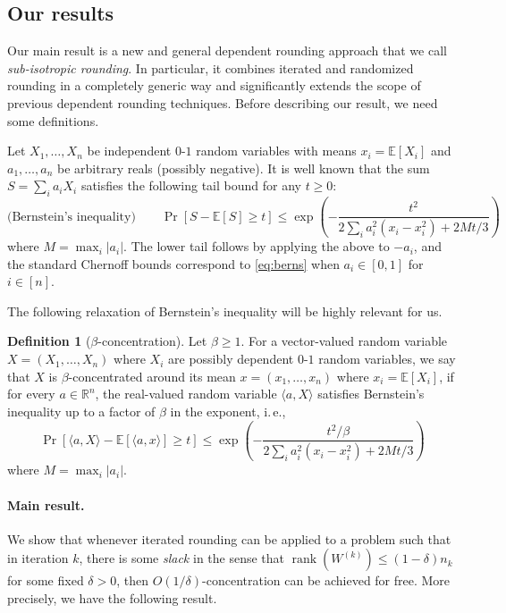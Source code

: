 \documentclass[11pt]{article}
\newcommand{\rank}{\operatorname{rank}}
\newcommand{\ip}[1]{\langle #1 \rangle}
\newcommand{\E}{\mathbb{E}}
\theoremstyle{definition}
\newtheorem{definition}[theorem]{Definition}
\newcommand{\R}{{\mathbb R}}
\newcommand{\ie}{i.\,e.}
\begin{document}
\subsection{Our results}
%
%
%

Our main result is a new and general dependent rounding approach that we call \emph{sub-isotropic rounding}. In particular, it combines iterated and randomized rounding in a completely generic way and significantly extends
the scope of previous dependent rounding techniques.
Before describing our result, we need some definitions.

Let $X_1,\ldots,X_n$ be  independent $0$-$1$ random variables with means $x_i = \E[X_i]$ and $a_1,\ldots,a_n$ be arbitrary reals (possibly negative). It is well known \cite{BLM13} that the sum
$S =\sum_i a_i X_i$ satisfies the following tail bound for any $t\geq 0$:
\begin{equation}
\label{eq:berns}
\text{(Bernstein's inequality)}  \quad \quad \Pr[ S - \E[S] \geq t] \leq \exp\left(-\frac{t^2}{2\sum_i a_i^2(x_i-x_i^2) + 2Mt/3}\right)
 \end{equation}
where $M = \max_{i} |a_i|$. The lower tail follows by applying the above to $-a_i$, and the standard Chernoff bounds correspond to \eqref{eq:berns} when $a_i\in[0,1]$ for $i\in [n]$.


The following relaxation of Bernstein's inequality will be
%
highly  %
relevant for us.
\begin{definition}[$\beta$-concentration] Let $\beta \geq 1$. For a
%
vector-valued   %
random variable $X=(X_1,\ldots,X_n)$ where $X_i$ are possibly dependent $0$-$1$ random variables, we say that $X$ is $\beta$-concentrated around its mean $x = (x_1,\ldots,x_n)$ where $x_i = \E[X_i]$,
if for every $a \in \R^n$, the real-valued random variable $\ip{a,X}$ satisfies Bernstein's inequality  up to a factor of $\beta$ in the exponent, \ie,
\begin{equation}
 \Pr[ \ip{a,X}- \E[\ip{a,x}] \geq t] \leq \exp\left(-\frac{t^2/\beta}{2\sum_i a_i^2(x_i-x_i^2) + 2Mt/3}\right)
 \end{equation}
%
where $M = \max_{i} |a_i|$.
\end{definition}

\paragraph{Main result.} We show that whenever iterated rounding can be applied to a problem such that in
%
iteration $k$,   %
there is some \emph{slack} in the sense that
$\rank(W^{(k)}) \leq (1-\delta) n_k$ for some fixed $\delta>0$,
then $O(1/\delta)$-concentration can be achieved for free.
More precisely, we have the following result.
%
\end{document}

